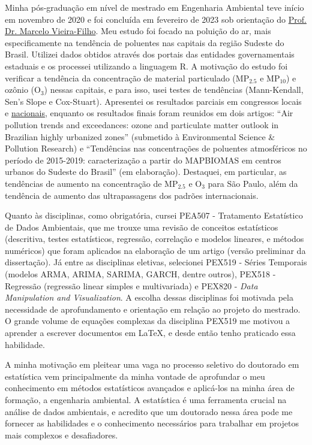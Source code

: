 \documentclass[12pt,a4paper]{article}
\begin{document}
	Minha pós-graduação em nível de mestrado em Engenharia Ambiental teve início em novembro de 2020 e foi concluída em fevereiro de 2023 sob orientação do \href{http://lattes.cnpq.br/5059318976988668}{Prof. Dr. Marcelo Vieira-Filho}. Meu estudo foi focado na poluição do ar, mais especificamente na tendência de poluentes nas capitais da região Sudeste do Brasil. Utilizei dados obtidos através dos portais das entidades governamentais estaduais e os processei utilizando a linguagem R. A motivação do estudo foi verificar a tendência da concentração de material particulado (MP$_{2.5}$ e MP$_{10}$) e ozônio (O$_3$) nessas capitais, e para isso, usei testes de tendências (Mann-Kendall, Sen's Slope e Cox-Stuart). Apresentei os resultados parciais em congressos locais e \href{http://www.meioambientepocos.com.br/ANAIS2022/76%20-%20244016_crescimento-da-concentrao-de-materiais-particulados-e-oznio-em-capitais-brasileiras.pdf}{nacionais}, enquanto os resultados finais foram reunidos em dois artigos: ``Air pollution trends and exceedances: ozone and particulate matter outlook in Brazilian highly urbanized zones'' (submetido à Environmental Science \& Pollution Research) e ``Tendências nas concentrações de poluentes atmosféricos no período de 2015-2019: caracterização a partir do MAPBIOMAS em centros urbanos do Sudeste do Brasil'' (em elaboração). Destaquei, em particular, as tendências de aumento na concentração de MP$_{2.5}$ e O$_3$ para São Paulo, além da tendência de aumento das ultrapassagens dos padrões internacionais.
	
	Quanto às disciplinas, como obrigatória, cursei PEA507 - Tratamento Estatístico de Dados Ambientais, que me trouxe uma revisão de conceitos estatísticos (descritiva, testes estatísticos, regressão, correlação e modelos lineares, e métodos numéricos) que foram aplicados na elaboração de um artigo (versão preliminar da dissertação). Já entre as disciplinas eletivas, selecionei PEX519 - Séries Temporais (modelos ARMA, ARIMA, SARIMA, GARCH, dentre outros), PEX518 - Regressão (regressão linear simples e multivariada) e PEX820 - \textit{Data Manipulation and Visualization}. A escolha dessas disciplinas foi motivada pela necessidade de aprofundamento e orientação em relação ao projeto do mestrado. O grande volume de equações complexas da disciplina PEX519 me motivou a aprender a escrever documentos em \LaTeX, e desde então tenho praticado essa habilidade.

	
	A minha motivação em pleitear uma vaga no processo seletivo do doutorado em estatística vem principalmente da minha vontade de aprofundar o meu conhecimento em métodos estatísticos avançados e aplicá-los na minha área de formação, a engenharia ambiental. A estatística é uma ferramenta crucial na análise de dados ambientais, e acredito que um doutorado nessa área pode me fornecer as habilidades e o conhecimento necessários para trabalhar em projetos mais complexos e desafiadores.
	
\end{document}
